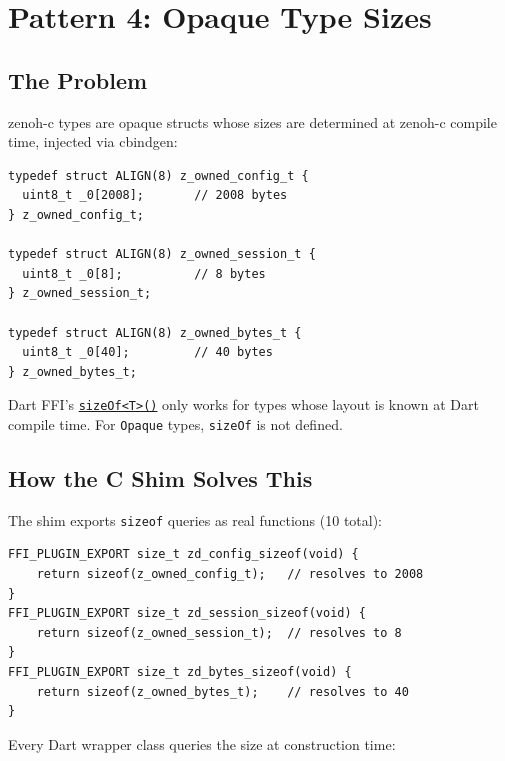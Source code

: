\documentclass[11pt,a4paper]{article}
\newcommand{\code}[1]{\texttt{#1}}
\newcommand{\file}[1]{\texttt{#1}}
\begin{document}
\section{Pattern 4: Opaque Type Sizes}
\label{sec:pattern4}

\subsection{The Problem}

zenoh-c types are opaque structs whose sizes are determined at zenoh-c
compile time, injected via cbindgen:

\begin{lstlisting}[style=cstyle,caption={Opaque type definitions from \file{zenoh\_opaque.h}}]
typedef struct ALIGN(8) z_owned_config_t {
  uint8_t _0[2008];       // 2008 bytes
} z_owned_config_t;

typedef struct ALIGN(8) z_owned_session_t {
  uint8_t _0[8];          // 8 bytes
} z_owned_session_t;

typedef struct ALIGN(8) z_owned_bytes_t {
  uint8_t _0[40];         // 40 bytes
} z_owned_bytes_t;
\end{lstlisting}

Dart FFI's \href{https://api.dart.dev/stable/latest/dart-ffi/sizeOf.html}{\code{sizeOf<T>()}}
only works for types whose layout is known at Dart compile time. For
\code{Opaque} types, \code{sizeOf} is not defined.


\subsection{How the C Shim Solves This}

The shim exports \code{sizeof} queries as real functions (10 total):

\begin{lstlisting}[style=cstyle]
FFI_PLUGIN_EXPORT size_t zd_config_sizeof(void) {
    return sizeof(z_owned_config_t);   // resolves to 2008
}
FFI_PLUGIN_EXPORT size_t zd_session_sizeof(void) {
    return sizeof(z_owned_session_t);  // resolves to 8
}
FFI_PLUGIN_EXPORT size_t zd_bytes_sizeof(void) {
    return sizeof(z_owned_bytes_t);    // resolves to 40
}
\end{lstlisting}

Every Dart wrapper class queries the size at construction time:
\end{document}
